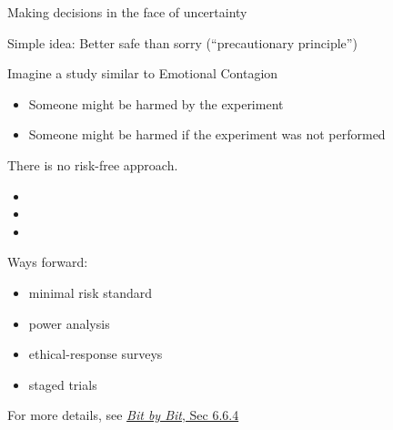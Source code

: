 \documentclass{beamer}
\begin{document}
\begin{frame}

\begin{center}
\Large{Making decisions in the face of uncertainty}
\end{center}

\end{frame}
\begin{frame}

Simple idea: Better safe than sorry (``precautionary principle'')

\end{frame}
\begin{frame}

Imagine a study similar to Emotional Contagion\\
\begin{itemize}
\item Someone might be harmed by the experiment
\pause
\item Someone might be harmed if the experiment was not performed
\end{itemize}

\vfill
There is no risk-free approach.

\end{frame}
\begin{frame}

\begin{itemize}
\item {}
\item {}
\item {}
\end{itemize}

\vfill
{}
\end{frame}
\begin{frame}

Ways forward:\\
\begin{itemize}
\pause
\item minimal risk standard
\pause
\item power analysis
\pause
\item ethical-response surveys
\pause
\item staged trials
\end{itemize}

For more details, see \href{https://www.bitbybitbook.com/en/1st-ed/ethics/dilemmas/uncertainty/}{\textit{Bit by Bit}, Sec 6.6.4}
\end{frame}
\end{document}
